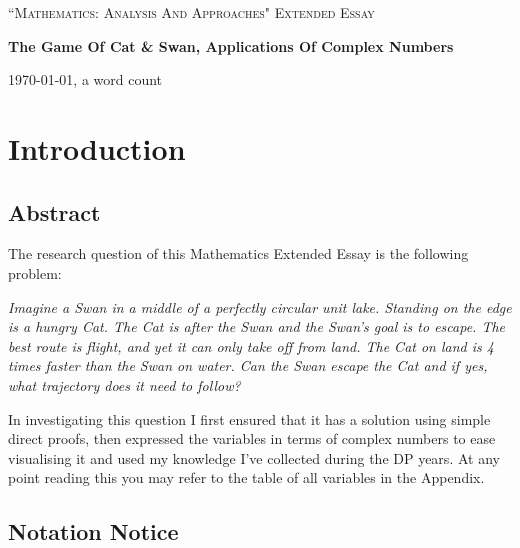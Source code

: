 \documentclass[12pt]{article}
\begin{document}
\begin{titlepage}
	\centering
	\vspace{1cm}
	{\Large \textsc{``Mathematics: Analysis And Approaches" Extended Essay}\par}
	\vspace{1.5cm}
	{\huge\bfseries The Game Of Cat \& Swan, Applications Of Complex Numbers\par}
	\vspace{2cm}
	\vfill
	\vfill
	{\large \today, a word count\par}
\end{titlepage}

\clearpage
{}
\tableofcontents
\newpage


\section{Introduction}
\subsection{Abstract}
The research question of this Mathematics Extended Essay is the following problem:

\emph{Imagine a Swan in a middle of a perfectly circular unit lake. Standing on the edge is a hungry Cat. The Cat is after the Swan and the Swan's goal is to escape. The best route is flight, and yet it can only take off from land. The Cat on land is 4 times faster than the Swan on water. Can the Swan escape the Cat and if yes, what trajectory does it need to follow?}

In investigating this question I first ensured that it has a solution using simple direct proofs, then expressed the variables in terms of complex numbers to ease visualising it and used my knowledge I've collected during the DP years. At any point reading this you may refer to the table of all variables in the Appendix.

\subsection{Notation Notice}
\end{document}
